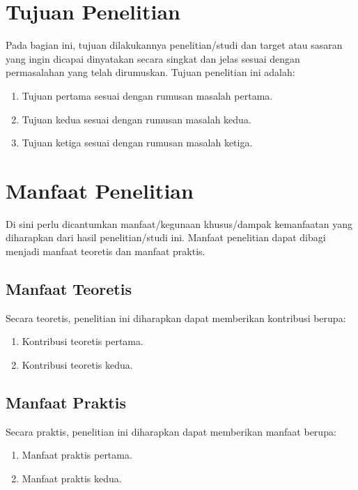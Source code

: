 \section{Tujuan Penelitian}

Pada bagian ini, tujuan dilakukannya penelitian/studi dan target atau sasaran yang ingin dicapai dinyatakan secara singkat dan jelas sesuai dengan permasalahan yang telah dirumuskan. Tujuan penelitian ini adalah:

\begin{enumerate}
    \item Tujuan pertama sesuai dengan rumusan masalah pertama.
    \item Tujuan kedua sesuai dengan rumusan masalah kedua.
    \item Tujuan ketiga sesuai dengan rumusan masalah ketiga.
\end{enumerate}

\section{Manfaat Penelitian}

Di sini perlu dicantumkan manfaat/kegunaan khusus/dampak kemanfaatan yang diharapkan dari hasil penelitian/studi ini. Manfaat penelitian dapat dibagi menjadi manfaat teoretis dan manfaat praktis.

\subsection{Manfaat Teoretis}

Secara teoretis, penelitian ini diharapkan dapat memberikan kontribusi berupa:

\begin{enumerate}
    \item Kontribusi teoretis pertama.
    \item Kontribusi teoretis kedua.
\end{enumerate}

\subsection{Manfaat Praktis}

Secara praktis, penelitian ini diharapkan dapat memberikan manfaat berupa:

\begin{enumerate}
    \item Manfaat praktis pertama.
    \item Manfaat praktis kedua.
\end{enumerate}

